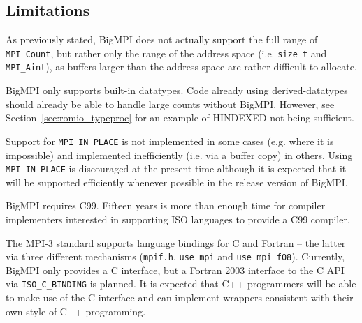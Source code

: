 \subsection{Limitations}

As previously stated, BigMPI does not actually support the full
range of \texttt{MPI\_Count}, but rather only the range of the
address space (i.e. \texttt{size\_t} and \texttt{MPI\_Aint}), as buffers
larger than the address space are rather difficult to allocate.

BigMPI only supports built-in datatypes.  
Code already using derived-datatypes should already be able 
to handle large counts without BigMPI\@.
However, see Section~\ref{sec:romio_typeproc} 
for an example of HINDEXED not being sufficient.

Support for \texttt{MPI\_IN\_PLACE} is not 
implemented in some cases (e.g. where it is impossible) and 
implemented inefficiently (i.e. via a buffer copy) in others.
Using \texttt{MPI\_IN\_PLACE} is discouraged at the present time
although it is expected that it will be supported efficiently whenever
possible in the release version of BigMPI.

BigMPI requires C99.  Fifteen years is more than enough time for compiler 
implementers interested in supporting ISO languages to provide a C99
compiler.

The MPI-3 standard supports language bindings for C and Fortran --
the latter via three different mechanisms
(\texttt{mpif.h}, \texttt{use mpi} and \texttt{use mpi\_f08}).
Currently, BigMPI only provides a C interface, but a Fortran 2003
interface to the C API via \texttt{ISO\_C\_BINDING} is planned.
It is expected that C++ programmers will be able to make use of the
C interface and can implement wrappers consistent with their own
style of C++ programming.